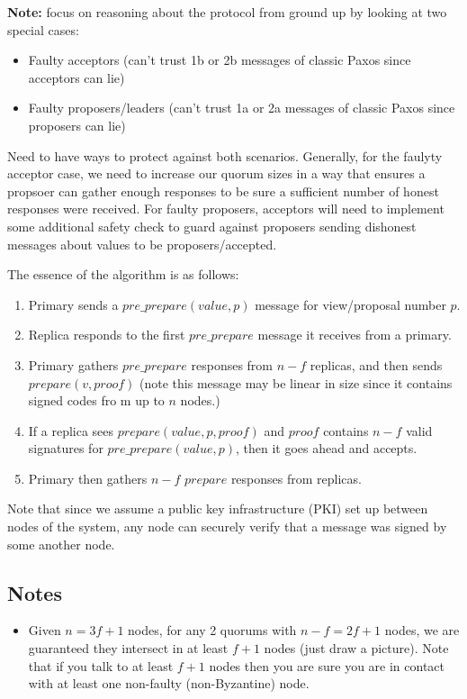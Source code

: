 \documentclass[10pt,a4paper]{article}
\begin{document}
\textbf{Note:} focus on reasoning about the protocol from ground up by looking at two special cases:
\begin{itemize}
    \item Faulty acceptors (can't trust 1b or 2b messages of classic Paxos since acceptors can lie)
    \item Faulty proposers/leaders (can't trust 1a or 2a messages of classic Paxos since proposers can lie)
\end{itemize}
Need to have ways to protect against both scenarios. Generally, for the faulyty acceptor case, we need to increase our quorum sizes in a way that ensures a propsoer can gather enough responses to be sure a sufficient number of honest responses were received. For faulty proposers, acceptors will need to implement some additional safety check to guard against proposers sending dishonest messages about values to be proposers/accepted.



The essence of the algorithm is as follows:
\begin{enumerate}
    \item Primary sends a $pre\_prepare(value, p)$ message for view/proposal number $p$.
    \item Replica responds to the first $pre\_prepare$ message it receives from a primary.
    \item Primary gathers $pre\_prepare$ responses from $n-f$ replicas, and then sends $prepare(v, proof)$ (note this message may be linear in size since it contains signed codes fro   m up to $n$ nodes.)
    \item If a replica sees $prepare(value, p, proof)$ and $proof$ contains $n-f$ valid signatures for $pre\_prepare(value, p)$, then it goes ahead and accepts.
    \item Primary then gathers $n-f$ $prepare$ responses from replicas.
\end{enumerate}
Note that since we assume a public key infrastructure (PKI) set up between nodes of the system, any node can securely verify that a message was signed by some another node.

\subsection{Notes}
\begin{itemize}
    \item Given $n=3f+1$ nodes, for any 2 quorums with $n-f = 2f+1$ nodes, we are guaranteed they intersect in at least $f+1$ nodes (just draw a picture). Note that if you talk to at least $f+1$ nodes then you are sure you are in contact with at least one non-faulty (non-Byzantine) node.
\end{itemize}




\end{document}
